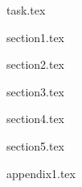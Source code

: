 \documentclass{metrotek}
\begin{document}

\maketitle

\newpage

\setcounter{page}{2}
\tableofcontents

\newpage

{task.tex}

\newpage

{section1.tex}

\newpage

{section2.tex}

\newpage

{section3.tex}

\newpage

{section4.tex}

\newpage

{section5.tex}

\newpage

{appendix1.tex}
\end{document}
